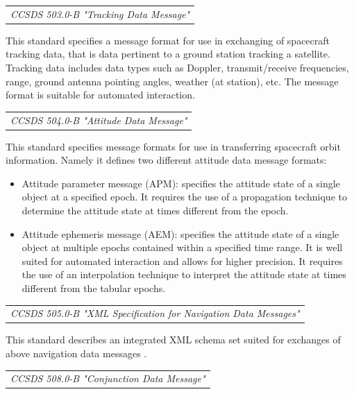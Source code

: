 \begin{tabular}{l}
\textit{CCSDS 503.0-B "Tracking Data Message" \cite{CCSDS 503.0-B}} \\
\end{tabular}

This standard specifies a message format for use in exchanging of spacecraft tracking data, that is data pertinent to a ground station tracking a satellite. Tracking data includes data types such as Doppler, transmit/receive frequencies, range, ground antenna pointing angles, weather (at station), etc. The message format is suitable for automated interaction.

\begin{tabular}{l}
\textit{CCSDS 504.0-B "Attitude Data Message" \cite{CCSDS 504.0-B}} \\
\end{tabular}

This standard specifies message formats for use in transferring spacecraft orbit information. Namely it defines two different attitude data message formats:

\begin{itemize}
\item Attitude parameter message (APM): specifies the attitude state of a single object at a specified epoch. It requires the use of a propagation technique to determine the attitude state at times different from the epoch.
\item Attitude ephemeris message (AEM): specifies the attitude state of a single object at multiple epochs contained within a specified time range. It is well suited for automated interaction and allows for higher precision. It requires the use of an interpolation technique to interpret the attitude state at times different from the tabular epochs. 
\end{itemize}

\begin{tabular}{l}
\textit{CCSDS 505.0-B "XML Specification for Navigation Data Messages" \cite{CCSDS 505.0-B}} \\
\end{tabular}

This standard describes an integrated XML schema set suited for exchanges of above navigation data messages . 

\begin{tabular}{l}
\textit{CCSDS 508.0-B "Conjunction Data Message" \cite{CCSDS 508.0-B}} \\
\end{tabular}

